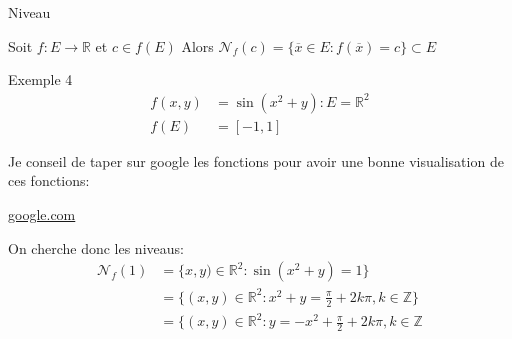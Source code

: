 \begin{parag}{Niveau}
    \begin{definition}
        Soit $f : E \to \mathbb{R}$ et $c \in f(E)$ Alors $ \mathcal{N}_f(c) = \{ \overline{x} \in E: f( \overline{x}) = c\} \subset E$
    \end{definition}
    \begin{subparag}{Exemple 4}
        \begin{align*}
            f(x, y) &= \sin(x^2 + y) : E = \mathbb{R}^2\\
            f(E) &= [-1, 1]
        \end{align*}
        
        \begin{framedremark}
            Je conseil de taper sur google les fonctions pour avoir une bonne visualisation de ces fonctions:
            \begin{center}
                \href{https://www.google.com/search?q=sin(x%5E2+%2B+y)&oq=sin(x%5E2+%2B+y)&gs_lcrp=EgZjaHJvbWUyBggAEEUYOTIICAEQABgWGB4yCAgCEAAYFhgeMggIAxAAGBYYHjIICAQQABgWGB4yCAgFEAAYFhgeMgYIBhBFGDwyBggHEEUYPNIBCDM0MDlqMGo0qAIAsAIB&sourceid=chrome&ie=UTF-8}{google.com}
            \end{center}
            
        \end{framedremark}
        On cherche donc les niveaus:
        \begin{align*}
            \mathcal{N}_f(1) &= \{x, y) \in \mathbb{R}^2: \sin(x^2 + y) = 1\}  \\
                             &= \{(x, y) \in \mathbb{R}^2: x^2 + y = \frac{\pi}{2} + 2k\pi, k \in \mathbb{Z}\}\\
                             &= \{(x, y) \in \mathbb{R}^2: y = -x^2 + \frac{\pi}{2} + 2k\pi, k \in \mathbb{Z}
        \end{align*}
        
        
    \end{subparag}

\end{parag}





















